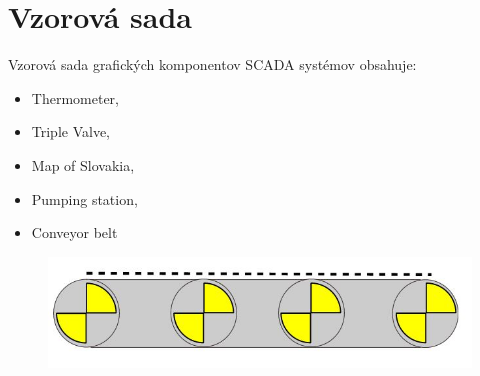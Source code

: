 \chapter{Vzorová sada}

Vzorová sada grafických komponentov SCADA systémov obsahuje:
\begin{itemize}
	\item Thermometer,
	\item Triple Valve, 
	\item Map of Slovakia,
	\item Pumping station, 
	\item Conveyor belt 
	
\end{itemize}

\begin{figure}[H]
\centering
\includegraphics[width=0.7\linewidth]{obrazky/vzorovaSada/belt}
\caption{}
\label{fig:belt}
\end{figure}


